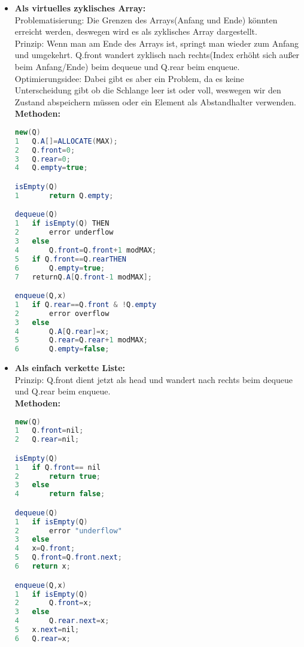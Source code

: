 \documentclass[jou,apacite]{apa6}
\begin{document}
\begin{itemize}
\item {\bfseries Als virtuelles zyklisches Array:} \\
Problematisierung: Die Grenzen des Arrays(Anfang und Ende) könnten erreicht werden, 
deswegen wird es als zyklisches Array dargestellt. \\
Prinzip: Wenn man am Ende des Arrays ist, springt man wieder zum Anfang und umgekehrt. Q.front wandert zyklisch nach rechts(Index erhöht sich außer beim Anfang/Ende) beim dequeue und Q.rear beim enqueue. \\
Optimierungsidee: Dabei gibt es aber ein Problem, da es keine Unterscheidung gibt ob die Schlange leer ist oder voll, weswegen wir den Zustand abspeichern müssen oder ein Element als Abstandhalter verwenden. \\
{\bfseries Methoden:} 
\begin{lstlisting}[language=java]
new(Q)
1   Q.A[]=ALLOCATE(MAX);
2   Q.front=0;
3   Q.rear=0;
4   Q.empty=true;

isEmpty(Q)
1       return Q.empty;

dequeue(Q)
1   if isEmpty(Q) THEN
2       error underflow
3   else 
4       Q.front=Q.front+1 modMAX;
5   if Q.front==Q.rearTHEN
6       Q.empty=true;
7   returnQ.A[Q.front-1 modMAX];

enqueue(Q,x)
1   if Q.rear==Q.front & !Q.empty
2       error overflow
3   else 
4       Q.A[Q.rear]=x;
5       Q.rear=Q.rear+1 modMAX;
6       Q.empty=false;
\end{lstlisting}
\item {\bfseries Als einfach verkette Liste:}\\
Prinzip: Q.front dient jetzt als head und wandert nach rechts beim dequeue und Q.rear beim enqueue. \\
{\bfseries Methoden:} 
\begin{lstlisting}[language=java]
new(Q)
1   Q.front=nil;
2   Q.rear=nil;

isEmpty(Q)
1   if Q.front== nil
2       return true;
3   else 
4       return false;

dequeue(Q)
1   if isEmpty(Q) 
2       error "underflow"
3   else
4   x=Q.front;
5   Q.front=Q.front.next;
6   return x;

enqueue(Q,x)
1   if isEmpty(Q) 
2       Q.front=x;
3   else
4       Q.rear.next=x; 
5   x.next=nil;
6   Q.rear=x;
\end{lstlisting}
\end{itemize}
\end{document}
